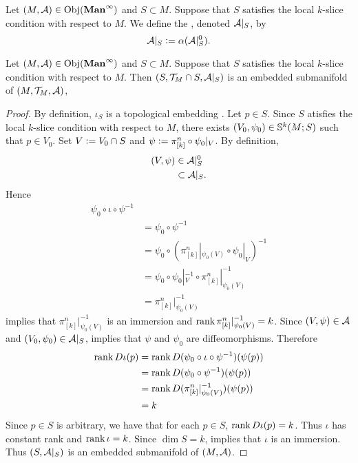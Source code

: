 \documentclass{book}
\begin{document}
	\begin{defn} 
			Let $(M, \MA) \in \Obj(\Maninf)$ and $S \subset M$. Suppose that $S$ satisfies the local $k$-slice condition with respect to $M$. We define the , denoted $\MA|_S$, by 
			$$\MA|_S \defeq \al(\MA|_S^0).$$
	\end{defn}
	
	\begin{ex} 
		Let $(M, \MA) \in \Obj(\Maninf)$ and $S \subset M$. Suppose that $S$ satisfies the local $k$-slice condition with respect to $M$. Then $(S, \MT_M \cap S, \MA|_S)$ is an embedded submanifold of $(M, \MT_M, \MA)$,
	\end{ex}

	\begin{proof} 
		By definition, $\iota_S$ is a topological embedding . Let $p \in S$. Since $S$ atisfies the local $k$-slice condition with respect to $M$, there exists $(V_0, \psi_0) \in \S^k(M; S)$ such that $p \in V_0$. Set $V \defeq V_0 \cap S$ and $\psi \defeq \pi^n_{[k]} \circ \psi_0|_V$. By definition,  
		\begin{align*}
			(V, \psi) 
			& \in \MA|_S^0 \\
			& \subset \MA|_S.
		\end{align*}
		Hence 
		\begin{align*}
			\psi_0 \circ \iota \circ \psi^{-1} \\
			& = \psi_0 \circ \psi^{-1} \\
			& = \psi_0 \circ (\pi^n_{[k]}|_{\psi_0(V)} \circ \psi_0|_V)^{-1} \\
			& = \psi_0 \circ \psi_0|_V^{-1} \circ \pi^n_{[k]}|_{\psi_0(V)}^{-1} \\
			& = \pi^n_{[k]}|_{\psi_0(V)}^{-1} 
		\end{align*}
		 implies that $\pi^n_{[k]}|_{\psi_0(V)}^{-1}$ is an immersion and $\rnk \pi^n_{[k]}|_{\psi_0(V)}^{-1} = k$. Since $(V, \psi) \in \MA$ and $(V_0, \psi_0) \in \MA|_S$,  implies that $\psi$ and $\psi_0$ are diffeomorphisms. Therefore
		\begin{align*}
			\rnk D \iota (p)
			& = \rnk D (\psi_0 \circ \iota \circ \psi^{-1})(\psi(p)) \\
			& = \rnk D (\psi_0 \circ \psi^{-1})(\psi(p)) \\
			& = \rnk D (\pi^n_{[k]}|_{\psi_0(V)}^{-1})(\psi(p)) \\
			& = k
		\end{align*}  
		Since $p \in S$ is arbitrary, we have that for each $p \in S$, $\rnk D \iota (p) = k$. Thus $\iota$ has constant rank and $\rnk \iota = k$. Since $\dim S = k$,  implies that $\iota$ is an immersion. Thus $(S, \MA|_S)$ is an embedded submanifold of $(M, \MA)$.
	\end{proof}
	
\end{document}
